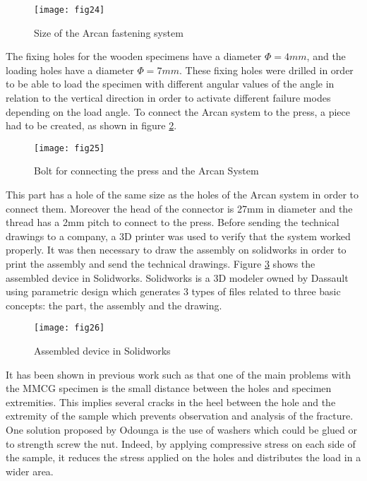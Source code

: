 \begin{figure}[htp]
	\centering
	\texttt{[image: fig24]}
	\caption{Size of the Arcan fastening system \cite{Odounga2018phd}}
	\label{fig:fig24}
\end{figure}

The fixing holes for the wooden specimens have a diameter $\Phi= 4 mm$, and the loading holes have a diameter $\Phi = 7 mm$. These fixing holes were drilled in order to be able to load the specimen with different angular values of the angle in relation to the vertical direction in order to activate different failure modes depending on the load angle. To connect the Arcan system to the press, a piece had to be created, as shown in figure \ref{fig:fig25}.


\begin{figure}[htp]
	\centering
	\texttt{[image: fig25]}
	\caption{Bolt for connecting the press and the Arcan System}
	\label{fig:fig25}
\end{figure}

This part has a hole of the same size as the holes of the Arcan system in order to connect them. Moreover the head of the connector is 27mm in diameter and the thread has a 2mm pitch to connect to the press. Before sending the technical drawings to a company, a 3D printer was used to verify that the system worked properly. It was then necessary to draw the assembly on solidworks in order to print the assembly and send the technical drawings. Figure \ref{fig:fig26} shows the assembled device in Solidworks. Solidworks is a 3D modeler owned by Dassault using parametric design which generates 3 types of files related to three basic concepts: the part, the assembly and the drawing.


\begin{figure}[htp]
	\centering
	\texttt{[image: fig26]}
	\caption{Assembled device in Solidworks}
	\label{fig:fig26}
\end{figure}

It has been shown in previous work such as \cite{Odounga2018phd} that one of the main problems with the MMCG specimen is the small distance between the holes and specimen extremities. This implies several cracks in the heel between the hole and the extremity of the sample which prevents observation and analysis of the fracture. One solution proposed by Odounga is the use of washers which could be glued or to strength screw the nut. Indeed, by applying compressive stress on each side of the sample, it reduces the stress applied on the holes and distributes the load in a wider area.

